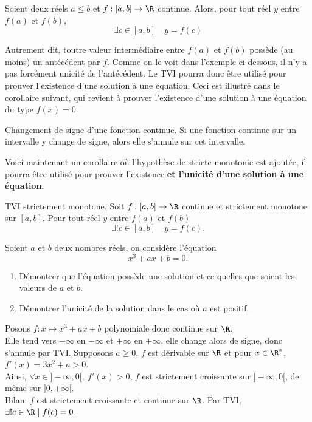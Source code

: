\documentclass[11pt]{article}
\begin{document}
\begin{thm}{}{}
    Soient deux réels $a\leq b$ et $f:[a,b]\to\R$ continue. Alors, pour tout réel $y$ entre $f(a)$ et $f(b)$,
    \begin{equation*}
        \exists c\in[a,b]\quad y=f(c)
    \end{equation*}
\end{thm}
Autrement dit, toutre valeur intermédiaire entre $f(a)$ et $f(b)$ possède (au moins) un antécédent par $f$. Comme on le voit dans l'exemple ci-dessous, il n'y a pas forcément unicité de l'antécédent.\n
Le TVI pourra donc être utilisé pour prouver l'existence d'une solution à une équation. Ceci est illustré dans le corollaire suivant, qui revient à prouver l'existence d'une solution à une équation du type $f(x)=0$.

\begin{corr}{Changement de signe d'une fonction continue.}{}
    Si une fonction continue sur un intervalle y change de signe, alors elle s'annule sur cet intervalle.
\end{corr}

Voici maintenant un corollaire où l'hypothèse de stricte monotonie est ajoutée, il pourra être utilisé pour prouver l'existence \bf{et} l'unicité d'une solution à une équation.

\begin{corr}{TVI strictement monotone.}{}
    Soit $f:[a,b]\to\R$ continue et strictement monotone sur $[a,b]$. Pour tout réel $y$ entre $f(a)$ et $f(b)$
    \begin{equation*}
        \exists!c\in[a,b]\quad y=f(c).
    \end{equation*}
\end{corr}

\begin{ex}{}{}
    Soient $a$ et $b$ deux nombres réels, on considère l'équation
    \begin{equation*}
        x^3+ax+b=0.
    \end{equation*}
    \begin{enumerate}
        \item Démontrer que l'équation possède une solution et ce quelles que soient les valeurs de $a$ et $b$.
        \item Démontrer l'unicité de la solution dans le cas où $a$ est positif.
    \end{enumerate}
    \tcblower
     Posons $f:x\mapsto x^3+ax+b$ polynomiale donc continue sur $\R$.\\
    Elle tend vers $-\infty$ en $-\infty$ et $+\infty$ en $+\infty$, elle change alors de signe, donc s'annule par TVI.\n
     Supposons $a\geq0$, $f$ est dérivable sur $\R$ et pour $x\in\R^*$, $f'(x)=3x^2+a>0$.\\
    Ainsi, $\forall x\in]-\infty,0[, ~ f'(x)>0$, $f$ est strictement croissante sur $]-\infty,0[$, de même sur $]0,+\infty[$.\\
    Bilan: $f$ est strictement croissante et continue sur $\R$. Par TVI, $\exists!c\in\R\mid f(c)=0$.
\end{ex}
\end{document}
